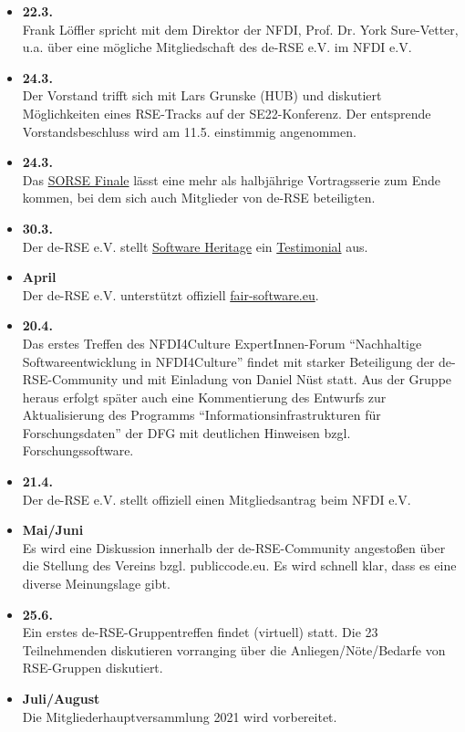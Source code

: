 \begin{itemize}
  \item \textbf{22.3.}\\Frank Löffler spricht mit dem Direktor der NFDI, Prof. Dr. York Sure-Vetter, u.a. über eine mögliche Mitgliedschaft des de-RSE e.V. im NFDI e.V.
  \item \textbf{24.3.}\\Der Vorstand trifft sich mit Lars Grunske (HUB) und diskutiert Möglichkeiten eines RSE-Tracks auf der SE22-Konferenz. Der entsprende Vorstandsbeschluss wird am 11.5. einstimmig angenommen.
  \item \textbf{24.3.}\\Das \href{https://sorse.github.io/programme/finale/}{SORSE Finale} lässt eine mehr als halbjährige Vortragsserie zum Ende kommen, bei dem sich auch Mitglieder von de-RSE beteiligten.
  \item \textbf{30.3.}\\Der de-RSE e.V. stellt \href{https://www.softwareheritage.org}{Software Heritage} ein \href{https://www.softwareheritage.org/2021/03/30/society-for-research-software-in-germany-de-rse/}{Testimonial} aus.
  \item \textbf{April}\\Der de-RSE e.V. unterstützt offiziell \href{https://fair-software.eu/endorse}{fair-software.eu}.
  \item \textbf{20.4.}\\Das erstes Treffen des NFDI4Culture ExpertInnen-Forum ``Nachhaltige Softwareentwicklung in NFDI4Culture'' findet mit starker Beteiligung der de-RSE-Community und mit Einladung von Daniel Nüst statt. Aus der Gruppe heraus erfolgt später auch eine Kommentierung des Entwurfs zur Aktualisierung des Programms ``Informationsinfrastrukturen für Forschungsdaten'' der DFG mit deutlichen Hinweisen bzgl. Forschungssoftware.
  \item \textbf{21.4.}\\Der de-RSE e.V. stellt offiziell einen Mitgliedsantrag beim NFDI e.V.
  \item \textbf{Mai/Juni}\\Es wird eine Diskussion innerhalb der de-RSE-Community angestoßen über die Stellung des Vereins bzgl. publiccode.eu. Es wird schnell klar, dass es eine diverse Meinungslage gibt.
  \item \textbf{25.6.}\\Ein erstes de-RSE-Gruppentreffen findet (virtuell) statt. Die 23 Teilnehmenden diskutieren vorranging über die Anliegen/Nöte/Bedarfe von RSE-Gruppen diskutiert.
  \item \textbf{Juli/August}\\Die Mitgliederhauptversammlung 2021 wird vorbereitet.

\end{itemize}
